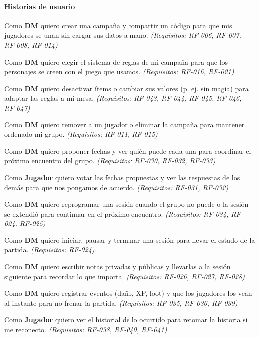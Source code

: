 \paragraph{Historias de usuario}
\begin{description}[leftmargin=2.2cm,labelwidth=2cm,itemsep=3pt]
\item[HU-01] Como \textbf{DM} quiero crear una campaña y compartir un código para que mis jugadores se unan sin cargar sus datos a mano. \textit{(Requisitos: RF-006, RF-007, RF-008, RF-014)}
\item[HU-02] Como \textbf{DM} quiero elegir el sistema de reglas de mi campaña para que los personajes se creen con el juego que usamos. \textit{(Requisitos: RF-016, RF-021)}
\item[HU-03] Como \textbf{DM} quiero desactivar ítems o cambiar sus valores (p. ej. sin magia) para adaptar las reglas a mi mesa. \textit{(Requisitos: RF-043, RF-044, RF-045, RF-046, RF-047)}
\item[HU-04] Como \textbf{DM} quiero remover a un jugador o eliminar la campaña para mantener ordenado mi grupo. \textit{(Requisitos: RF-011, RF-015)}
\item[HU-05] Como \textbf{DM} quiero proponer fechas y ver quién puede cada una para coordinar el próximo encuentro del grupo. \textit{(Requisitos: RF-030, RF-032, RF-033)}
\item[HU-06] Como \textbf{Jugador} quiero votar las fechas propuestas y ver las respuestas de los demás para que nos pongamos de acuerdo. \textit{(Requisitos: RF-031, RF-032)}
\item[HU-07] Como \textbf{DM} quiero reprogramar una sesión cuando el grupo no puede o la sesión se extendió para continuar en el próximo encuentro. \textit{(Requisitos: RF-034, RF-024, RF-025)}
\item[HU-08] Como \textbf{DM} quiero iniciar, pausar y terminar una sesión para llevar el estado de la partida. \textit{(Requisitos: RF-024)}
\item[HU-09] Como \textbf{DM} quiero escribir notas privadas y públicas y llevarlas a la sesión siguiente para recordar lo que importa. \textit{(Requisitos: RF-026, RF-027, RF-028)}
\item[HU-10] Como \textbf{DM} quiero registrar eventos (daño, XP, loot) y que los jugadores los vean al instante para no frenar la partida. \textit{(Requisitos: RF-035, RF-036, RF-039)}
\item[HU-11] Como \textbf{Jugador} quiero ver el historial de lo ocurrido para retomar la historia si me reconecto. \textit{(Requisitos: RF-038, RF-040, RF-041)}

\end{description}
